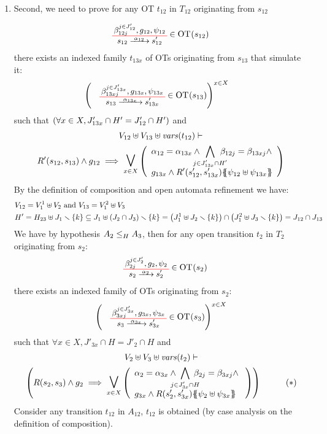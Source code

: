 \documentclass[runningheads]{llncs}
\begin{document}
\begin{enumerate}
\item Second, we need to prove for any OT $t_{12}$ in $T_{12}$ originating from $s_{12}$

\begin{align*}
		&  \OTx{12}{}{12}{12} \in \fOT{s_{12}}
\end{align*}		
there exists an indexed family $t_{13x}$ of OTs originating from $s_{13}$ that simulate it: 
\begin{align*}
		&  \mpar{\OTx{13}{x}{13x}{13x} \in \fOT{s_{13}}}^{x \in X}
\end{align*}	
such that  $\mpar{\forall x \in X, J'_{13x} \cap H' = J'_{12} \cap H'}$ and
\begin{multline*}	
V_{12} \uplus V_{13} \uplus \fvars{t_{12}} \vdash\\ R'\mpar{s_{12}, s_{13}} \wedge g_{12} \implies \operatorname*{\bigsymb{\bigvee}}_{x \in X} \mpar{\everymath{\displaystyle}\begin{array}{l}
			\alpha_{12} = \alpha_{13x} \wedge \bigwedge_\subbox{j \in J'_{13x} \cap H'} \beta_{12j} = \beta_{13xj} \wedge\\[12pt]
			 g_{13x} \wedge R'\mpar{s'_{12}, s'_{13x}}\psubst{\psi_{12} \uplus \psi_{13x}}
		\end{array}} 
	\end{multline*}
By the definition of composition and open automata refinement we have: 
\begin{align*}
&V_{12}= V^1_1\uplus V_2 \text{ and }
V_{13}= V^2_1\uplus V_3\\
& H'=H_{23}\uplus J_1 \setminus \{k\} \subseteq J_1\uplus \mpar{J_2 \cap J_3} \setminus \{k\} = \mpar{J^1_1\uplus J_2 \setminus \{k\} } \cap \mpar{J^2_1\uplus J_3 \setminus \{k\}} = J_{12 } \cap J_{13} \\
\end{align*}
We have by hypothesis $\wrel{A_2}{A_3}{H}$, then for any open transition $t_2$ in $T_2$  originating from $s_2$:
\begin{align*}
\OTx{2}{}{2}{2} \in \fOT{s_2}
\end{align*}
there exists an indexed family of OTs originating from $s_{2}$: 
\begin{align*}
\mpar{\OTx{3}{x}{3x}{3x} \in \fOT{s_{3}}}^{x \in X} 
\end{align*}
such that $\forall x \in X, J'_{3x} \cap H = J'_2 \cap H$ and
\begin{multline*}
V_2 \uplus V_3 \uplus \fvars{t_2} \vdash\\ \mpar{R\mpar{s_2, s_3} \wedge g_2 \implies \operatorname*{\bigsymb{\bigvee}}_{x \in X} \mpar{\everymath{\displaystyle}
\begin{array}{l}
			\alpha_2 = \alpha_{3x} \wedge \bigwedge_\subbox{j \in J'_{3x} \cap H} \beta_{2j} = \beta_{3xj} \nwedge\\
			 g_{3x} \wedge R\mpar{s'_2, s'_{3x}}\psubst{\psi_2 \uplus \psi_{3x}}
		\end{array}}}  \qquad \quad (*)
\end{multline*}	
\smallskip
Consider any transition $t_{12}$ in $A_{12}$,  $t_{12}$ is obtained (by case analysis on the definition of composition).  
 

\end{enumerate}
\end{document}
